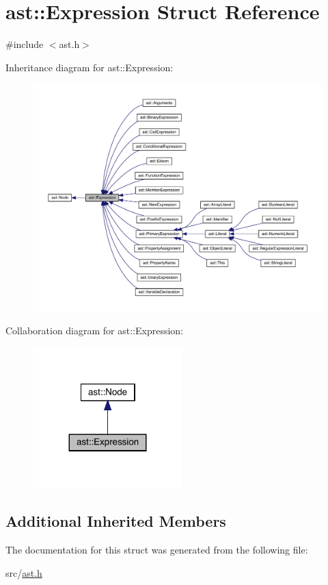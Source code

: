 \hypertarget{structast_1_1_expression}{}\section{ast\+:\+:Expression Struct Reference}
\label{structast_1_1_expression}


{\ttfamily \#include $<$ast.\+h$>$}



Inheritance diagram for ast\+:\+:Expression\+:\nopagebreak
\begin{figure}[H]
\begin{center}
\leavevmode
\includegraphics[width=350pt]{structast_1_1_expression__inherit__graph}
\end{center}
\end{figure}


Collaboration diagram for ast\+:\+:Expression\+:\nopagebreak
\begin{figure}[H]
\begin{center}
\leavevmode
\includegraphics[width=164pt]{structast_1_1_expression__coll__graph}
\end{center}
\end{figure}
\subsection*{Additional Inherited Members}


The documentation for this struct was generated from the following file\+:\begin{DoxyCompactItemize}
\item 
src/\hyperlink{ast_8h}{ast.\+h}\end{DoxyCompactItemize}
